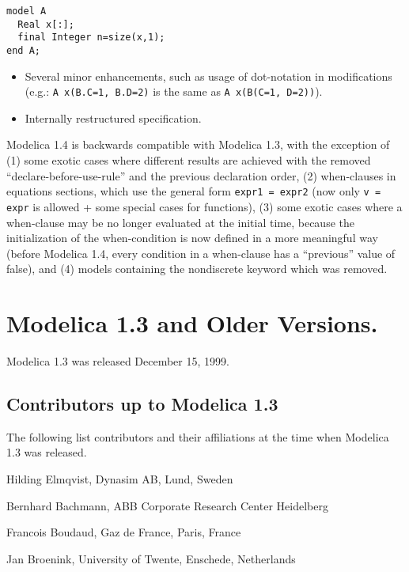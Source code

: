 \begin{lstlisting}[language=modelica]
model A
  Real x[:];
  final Integer n=size(x,1);
end A;
\end{lstlisting}

\begin{itemize}
\item
  Several minor enhancements, such as usage of dot-notation in
  modifications\\
  (e.g.: \lstinline!A x(B.C=1, B.D=2)! is the same as \lstinline!A x(B(C=1, D=2))!).
\item
  Internally restructured specification.
\end{itemize}

Modelica 1.4 is backwards compatible with Modelica 1.3, with the
exception of (1) some exotic cases where different results are achieved
with the removed ``declare-before-use-rule'' and the previous declaration
order, (2) when-clauses in equations sections, which use the general
form \lstinline!expr1 = expr2! (now only \lstinline!v = expr! is allowed + some special cases
for functions), (3) some exotic cases where a when-clause may be no
longer evaluated at the initial time, because the initialization of the
when-condition is now defined in a more meaningful way (before Modelica
1.4, every condition in a when-clause has a ``previous'' value of false),
and (4) models containing the nondiscrete keyword which was removed.

\section{Modelica 1.3 and Older Versions.}

Modelica 1.3 was released December 15, 1999.

\subsection{Contributors up to Modelica 1.3}
The following list contributors and their affiliations at the time when
Modelica 1.3 was released.

Hilding Elmqvist, Dynasim AB, Lund, Sweden

Bernhard Bachmann, ABB Corporate Research Center Heidelberg

Francois Boudaud, Gaz de France, Paris, France

Jan Broenink, University of Twente, Enschede, Netherlands

